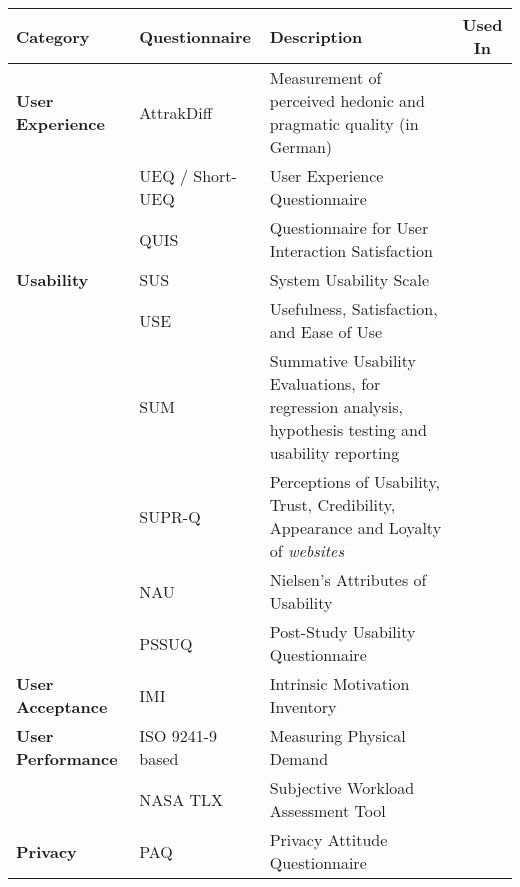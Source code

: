 \begin{tabular}{p{3.5cm}p{4.5cm}p{7.5cm}c}
\toprule
\textbf{Category} & \textbf{Questionnaire} & \textbf{Description} & \textbf{Used In} \\ \midrule




\textbf{User Experience} & AttrakDiff \cite{hassenzahl2003attrakdiff} & Measurement of perceived hedonic and pragmatic quality (in German) & \cite{Beyer2011}   \\
& UEQ / Short-UEQ \cite{UEQSurvey} & User Experience Questionnaire &    \\ 
& QUIS \cite{harper1993improving} & Questionnaire for User Interaction Satisfaction  &  \\ \hline




\textbf{Usability} & SUS \cite{SUSQuestionnaire} &  System Usability Scale & \cite{alt2011digifieds}  \\
& USE & Usefulness, Satisfaction, and Ease of Use  & \\
& SUM \cite{sauro2005method} &  Summative Usability Evaluations, for regression analysis, hypothesis testing and usability reporting &  \\
& SUPR-Q \cite{SUPRQSurvey} &  Perceptions of Usability, Trust, Credibility, Appearance and Loyalty of \textit{websites}  & \\
& NAU \cite{nielsen1994usability} & Nielsen's Attributes of Usability & \\
& PSSUQ \cite{Garcia2013UXResearch} & Post-Study Usability Questionnaire & \\ \hline




\textbf{User Acceptance} & IMI \cite{choi1996effect, mcauley1989psychometric} & Intrinsic Motivation Inventory & \cite{Huang2004, jacucci2010worldsofinformation}  \\ \hline




\textbf{User Performance} & ISO 9241-9 based \cite{chamsaz2010empirical} & Measuring Physical Demand & \cite{natapov2009iso, kratz2012palmspace} \\
& NASA TLX \cite{SurveyNASATLX} & Subjective Workload Assessment Tool & \cite{bailly2012shoesense} \\ \hline



\textbf{Privacy} & PAQ \cite{chignell2003privacy} & Privacy Attitude Questionnaire &   \\ \hline




\end{tabular}
